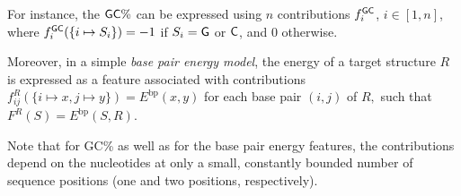 \documentclass[twocolumn]{bmcart}%
\newcommand{\R}{\mathcal{R}}
\newcommand{\EbpSym}{E^{\textrm{bp}}}
\newcommand{\Def}[1]{\emph{#1}}
\newcommand{\Nuc}[1]{{\sf #1}}
\newcommand{\Cb}{\Nuc{C}}
\newcommand{\Gb}{\Nuc{G}}
\newcommand{\GCb}{\Gb\Cb}
\newcommand{\citep}[1]{\cite{#1}}
\begin{document}
For instance, the $\GCb\%$ can be expressed using $n$ contributions $f^{\GCb}_i$, $i\in[1,n]$,  where $f^{\GCb}_i(\{i\mapsto S_i\})=-1$ if $S_i=\Gb$ or $\Cb$, and $0$ otherwise. 



Moreover, in a simple \Def{base pair energy model}, the energy of a target structure $R$ is expressed as a feature associated with contributions $f^R_{ij}(\{i\mapsto x, j\mapsto y\})=\EbpSym(x,y)$ for each base pair $(i,j)$ of $R,$ such that $F^R(S)=\EbpSym(S,R)$. 


Note that for \GCb\% as well as for the base pair energy features, the contributions depend on the nucleotides at only a small, constantly bounded number of sequence positions (one and two positions, respectively). 



\end{document}
